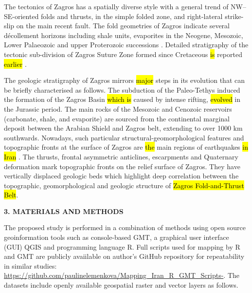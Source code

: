\documentclass[12pt,a4paper,oneside]{article}
\def \newsection{\vspace{12pt}\textbf}
\def \newpar{\vspace{6pt}}
\begin{document}
\newpar The tectonics of Zagros has a spatially diverse style with a general trend of NW–SE-oriented folds and thrusts, in the simple folded zone, and right-lateral strike-slip on the main recent fault. The fold geometries of Zagros indicate several décollement horizons including shale units, evaporites in the Neogene, Mesozoic, Lower Palaeozoic and upper Proterozoic successions \citep{Blanc}. Detailed stratigraphy of the tectonic sub-division of Zagros Suture Zone formed since Cretaceous \hl{is }reported \hl{earlier} \citep{Ali2014,Authemayou,Ali2012}. 

\newpar The geologic stratigraphy of Zagros mirrors \hl{major} steps in its evolution that can be briefly characterised as follows. The subduction of the Paleo-Tethys induced the formation of the Zagros Basin \hl{which is} caused by intense rifting, \hl{evolved} in the Jurassic period. The main rocks of the Mesozoic and Cenozoic reservoirs (carbonate, shale, and evaporite) are sourced from the continental marginal deposit between the Arabian Shield and Zagros belt, extending to over 1000 km southwards. Nowadays, such particular structural-geomorphological features and topographic fronts at the surface of Zagros are \hl{the} main regions of earthquakes \hl{in Iran} \citep{Berberian}. The thrusts, frontal asymmetric anticlines, escarpments and Quaternary deformation mark topographic fronts on the relief surface of Zagros. They have vertically displaced geologic beds which highlight deep correlation between the topographic, geomorphological and geologic structure of \hl{Zagros Fold-and-Thrust Belt}.

\newsection {3. MATERIALS AND METHODS}

\newpar The proposed study is performed in a combination of methods using open source geoinformation tools such as console-based GMT, a graphical user interface (GUI) QGIS and programming language R. Full scripts used for mapping by R and GMT are publicly avaiilable on author's GitHub repository for repeatability in similar studies: \href{https://github.com/paulinelemenkova/Mapping_Iran_R_GMT_Scripts-}{https://github.com/paulinelemenkova/Mapping\_Iran\_R\_GMT\_Scripts-}. The datasets include openly available geospatial raster and vector layers as follows. 
\end{document}
